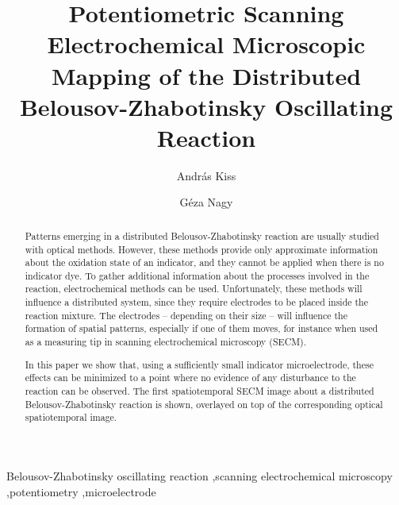 \documentclass[3p, twocolumn]{elsarticle}
\begin{document}
\begin{frontmatter}

\title{Potentiometric Scanning Electrochemical Microscopic Mapping of the Distributed Belousov-Zhabotinsky Oscillating Reaction}
\author[akiss]{András Kiss}
\address[akiss, gnagy]{Department of General and Physical Chemistry, Faculty of Sciences, University of Pécs, 7624 Pécs, Ifjúság útja 6, Hungary}
\author[gnagy]{Géza Nagy}


\begin{abstract}

Patterns emerging in a distributed Belousov-Zhabotinsky reaction are usually studied with optical methods.
However, these methods provide only approximate information about the oxidation state of an indicator, and they cannot be applied when there is no indicator dye.
To gather additional information about the processes involved in the reaction, electrochemical methods can be used.
Unfortunately, these methods will influence a distributed system, since they require electrodes to be placed inside the reaction mixture.
The electrodes -- depending on their size -- will influence the formation of spatial patterns, especially if one of them moves, for instance when used as a measuring tip in scanning electrochemical microscopy (SECM).

In this paper we show that, using a sufficiently small indicator microelectrode, these effects can be minimized to a point where no evidence of any disturbance to the reaction can be observed.
The first spatiotemporal SECM image about a distributed Belousov-Zhabotinsky reaction is shown, overlayed on top of the corresponding optical spatiotemporal image.

\end{abstract}
\begin{keyword}
	Belousov-Zhabotinsky oscillating reaction \sep scanning electrochemical microscopy \sep potentiometry \sep microelectrode
\end{keyword}
\end{frontmatter}
\end{document}
